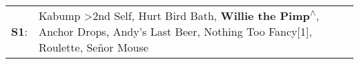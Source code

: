 \begin{supertabular}{p{0.03\textwidth}p{0.92\textwidth}}
 \textbf{S1}:  &  Kabump\textsuperscript{} \textgreater \enspace 2nd Self\textsuperscript{}, \enspace Hurt Bird Bath\textsuperscript{}, \enspace \textbf{Willie the Pimp\textsuperscript{$\wedge$}}, \enspace Anchor Drops\textsuperscript{}, \enspace Andy's Last Beer\textsuperscript{}, \enspace Nothing Too Fancy[1]\textsuperscript{}, \enspace Roulette\textsuperscript{}, \enspace Señor Mouse\textsuperscript{}  \enspace  \\
\end{supertabular}
